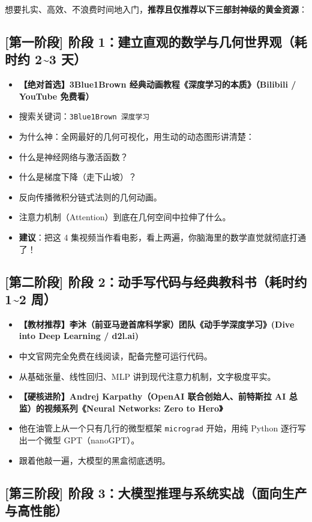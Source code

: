 想要扎实、高效、不浪费时间地入门，\textbf{推荐且仅推荐以下三部封神级的黄金资源}：

\subsection{[第一阶段] 阶段 1：建立直观的数学与几何世界观（耗时约 2\textasciitilde{}3 天）}

\begin{itemize}
  \item \textbf{【绝对首选】3Blue1Brown 经典动画教程《深度学习的本质》（Bilibili / YouTube 免费看）}
  \item 搜索关键词：\texttt{3Blue1Brown 深度学习}
  \item 为什么神：全网最好的几何可视化，用生动的动态图形讲清楚：
  \item 什么是神经网络与激活函数？
  \item 什么是梯度下降（走下山坡）？
  \item 反向传播微积分链式法则的几何动画。
  \item 注意力机制（Attention）到底在几何空间中拉伸了什么。
  \item \textbf{建议}：把这 4 集视频当作看电影，看上两遍，你脑海里的数学直觉就彻底打通了！
\end{itemize}

\subsection{[第二阶段] 阶段 2：动手写代码与经典教科书（耗时约 1\textasciitilde{}2 周）}

\begin{itemize}
  \item \textbf{【教材推荐】李沐（前亚马逊首席科学家）团队《动手学深度学习》(Dive into Deep Learning / d2l.ai)}
  \item 中文官网完全免费在线阅读，配备完整可运行代码。
  \item 从基础张量、线性回归、MLP 讲到现代注意力机制，文字极度平实。
  \item \textbf{【硬核进阶】Andrej Karpathy（OpenAI 联合创始人、前特斯拉 AI 总监）的视频系列《Neural Networks: Zero to Hero》}
  \item 他在油管上从一个只有几行的微型框架 \texttt{micrograd} 开始，用纯 Python 逐行写出一个微型 GPT（nanoGPT）。
  \item 跟着他敲一遍，大模型的黑盒彻底透明。
\end{itemize}

\subsection{[第三阶段] 阶段 3：大模型推理与系统实战（面向生产与高性能）}

